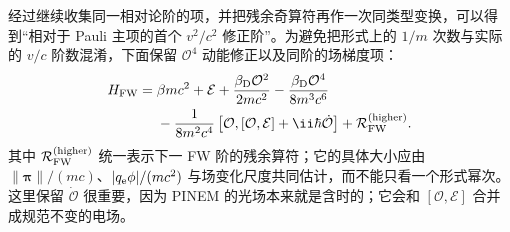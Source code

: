 经过继续收集同一相对论阶的项，并把残余奇算符再作一次同类型变换，可以得到“相对于 Pauli 主项的首个 $v^2/c^2$ 修正阶”。为避免把形式上的 $1/m$ 次数与实际的 $v/c$ 阶数混淆，下面保留 $\mathcal O^4$ 动能修正以及同阶的场梯度项：
\begin{align}
H_{\rm FW}
={}&\beta mc^2+\mathcal E
+\frac{\beta_{\rm D}\mathcal O^2}{2mc^2}
-\frac{\beta_{\rm D}\mathcal O^4}{8m^3c^6}
\nonumber\\
&-\frac{1}{8m^2c^4}
\left[
\mathcal O,
[\mathcal O,\mathcal E]+\ii\hbar\dot{\mathcal O}
\right]
+\mathcal R_{\rm FW}^{(\rm higher)}.
\label{eq:FW-general-order2}
\end{align}
其中 $\mathcal R_{\rm FW}^{(\rm higher)}$ 统一表示下一 FW 阶的残余算符；它的具体大小应由 $\|\bm\pi\|/(mc)$、$|q_{\rm e}\phi|/(mc^2)$ 与场变化尺度共同估计，而不能只看一个形式幂次。这里保留 $\dot{\mathcal O}$ 很重要，因为 PINEM 的光场本来就是含时的；它会和 $[\mathcal O,\mathcal E]$ 合并成规范不变的电场。

